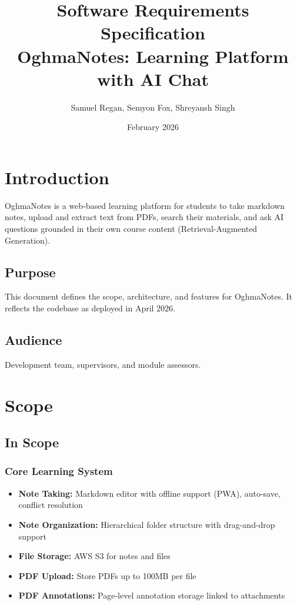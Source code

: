 \documentclass[12pt,a4paper]{article}
\title{Software Requirements Specification \\
\Large OghmaNotes: Learning Platform with AI Chat}
\author{Samuel Regan, Semyon Fox, Shreyansh Singh}
\date{February 2026}
\begin{document}
\maketitle

\tableofcontents
\newpage

\section{Introduction}

OghmaNotes is a web-based learning platform for students to take markdown notes, upload and extract text from PDFs, search their materials, and ask AI questions grounded in their own course content (Retrieval-Augmented Generation).

\subsection{Purpose}

This document defines the scope, architecture, and features for OghmaNotes. It reflects the codebase as deployed in April 2026.

\subsection{Audience}

Development team, supervisors, and module assessors.

\section{Scope}

\subsection{In Scope}

\subsubsection{Core Learning System}

\begin{itemize}
    \item \textbf{Note Taking:} Markdown editor with offline support (PWA), auto-save, conflict resolution
    \item \textbf{Note Organization:} Hierarchical folder structure with drag-and-drop support
    \item \textbf{File Storage:} AWS S3 for notes and files
    \item \textbf{PDF Upload:} Store PDFs up to 100MB per file
    \item \textbf{PDF Annotations:} Page-level annotation storage linked to attachments
\end{itemize}
\end{document}
